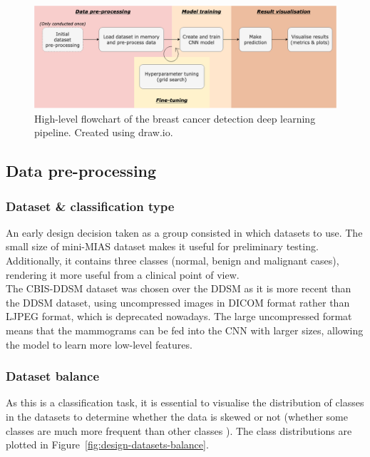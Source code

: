 \begin{figure}[ht]
\centerline{\includegraphics[width=1.1\textwidth]{Dissertation/figures/design/design flowchart.png}}
\caption{\label{fig:design-flowchart}High-level flowchart of the breast cancer detection deep learning pipeline. Created using draw.io.}
\end{figure}


\subsection{Data pre-processing}

\subsubsection{Dataset \& classification type}

An early design decision taken as a group consisted in which datasets to use. The small size of mini-MIAS dataset makes it useful for preliminary testing. Additionally, it contains three classes (normal, benign and malignant cases), rendering it more useful from a clinical point of view.\\  

The CBIS-DDSM dataset was chosen over the DDSM as it is more recent than the DDSM dataset, using uncompressed images in DICOM format rather than LJPEG format, which is deprecated nowadays. The large uncompressed format means that the mammograms can be fed into the CNN with larger sizes, allowing the model to learn more low-level features.

\subsubsection{Dataset balance}

As this is a classification task, it is essential to visualise the distribution of classes in the datasets to determine whether the data is skewed or not (whether some classes are much more frequent than other classes \citep{Geron2019}).  The class distributions are plotted in Figure~\ref{fig:design-datasets-balance}.

